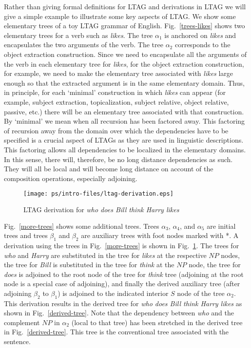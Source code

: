 Rather than giving formal definitions for LTAG and derivations in LTAG
we will give a simple example to illustrate some key aspects of
LTAG. We show some elementary trees of a toy LTAG grammar of
English. Fig.~\ref{trees-likes} shows two elementary trees for a verb
such as {\it likes}. The tree $\alpha_1$ is anchored on {\it likes}
and encapsulates the two arguments of the verb. The tree $\alpha_2$
corresponds to the object extraction construction. Since we need to
encapsulate all the arguments of the verb in each elementary tree for
{\it likes}, for the object extraction construction, for example, we
need to make the elementary tree associated with {\it likes} large
enough so that the extracted argument is in the same elementary
domain. Thus, in principle, for each `minimal' construction in which
{\it likes} can appear (for example, subject extraction,
topicalization, subject relative, object relative, passive, etc.)
there will be an elementary tree associated with that construction. By
`minimal' we mean when all recursion has been factored away. This
factoring of recursion away from the domain over which the
dependencies have to be specified is a crucial aspect of LTAGs as they
are used in linguistic descriptions. This factoring allows all
dependencies to be localized in the elementary domains. In this sense,
there will, therefore, be no long distance dependencies as such. They
will all be local and will become long distance on account of the
composition operations, especially adjoining.


\begin{figure*}[ht] 
\begin{center}
\texttt{[image: ps/intro-files/ltag-derivation.eps]}
\caption{\label{ltag-derivation} LTAG derivation for {\it who does Bill think Harry likes}}
\end{center}
\end{figure*}

Fig.~\ref{more-trees} shows some additional trees. Trees $\alpha_3$,
$\alpha_4$, and $\alpha_5$ are initial trees and trees $\beta_1$ and
$\beta_2$ are auxiliary trees with foot nodes marked with *. A
derivation using the trees in Fig.~\ref{more-trees} is shown in
Fig.~\ref{ltag-derivation}. The trees for {\it who} and {\it Harry}
are substituted in the tree for {\it likes} at the respective $NP$
nodes, the tree for {\it Bill} is substituted in the tree for {\it
think} at the $NP$ node, the tree for {\it does} is adjoined to the
root node of the tree for {\it think} tree (adjoining at the root node
is a special case of adjoining), and finally the derived auxiliary
tree (after adjoining $\beta_2$ to $\beta_1$) is adjoined to the
indicated interior $S$ node of the tree $\alpha_2$. This derivation
results in the derived tree for {\it who does Bill think Harry likes}
as shown in Fig.~\ref{derived-tree}. Note that the dependency between
{\it who} and the complement $NP$ in $\alpha_2$ (local to that tree)
has been stretched in the derived tree in
Fig.~\ref{derived-tree}. This tree is the conventional tree associated
with the sentence.


